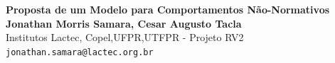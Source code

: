 \documentclass[a0,portrait]{a0poster}
\begin{document}


\begin{minipage}[b]{0.75\linewidth}
\veryHuge \color{NavyBlue} \textbf{Proposta de um Modelo para Comportamentos Não-Normativos } \color{Black}\\ %
\huge \textbf{Jonathan Morris Samara, Cesar Augusto Tacla}\\[0.5cm] %
\huge Institutos Lactec, Copel,UFPR,UTFPR - Projeto RV2\\[0.4cm] %
\Large \texttt{jonathan.samara@lactec.org.br} 
\end{minipage}
%
\vspace{1cm} %

\end{document}
